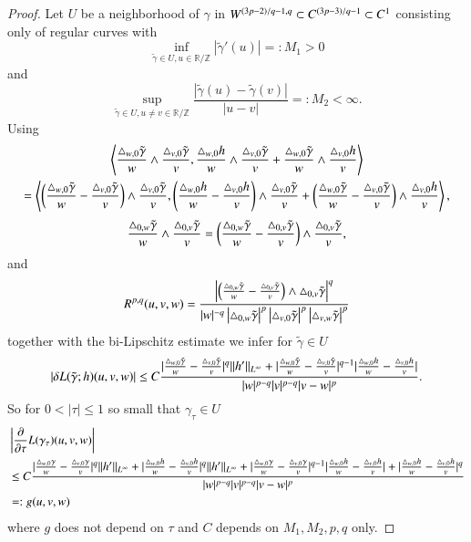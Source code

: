 \begin{proof}
Let $U$ be a neighborhood of $\gamma$ in $\W \subset C^{(3p-3)/q-1} \subset C^1$ consisting only of regular curves with
\begin{equation*}
 \inf_{\tilde \gamma \in U, u \in \mathbb R / \mathbb Z} |\tilde \gamma '(u)| =: M_1 >0 
\end{equation*}
and
\begin{equation*}
 \sup_{\tilde \gamma \in U, u\not=v \in \mathbb R / \mathbb Z} \frac {|\tilde \gamma(u) - \tilde \gamma(v)|}{|u-v|} =: M_2 < \infty. 
\end{equation*}
Using 
\begin{multline*}
 \sp{\frac {\T w0} w \wedge \frac{\T v0} v ,\frac {\T[h] w0} w \wedge \frac {\T v0} v 
 + \frac{\T w0} w\wedge \frac {\T[h] v0} v }
 \\= \sp{\left( \frac{\T w0} w - \frac {\T v0}v \right) \wedge \frac{\T v0} v ,
	\left( \frac{\T[h] w0} w - \frac {\T[h] v0}v \right) \wedge \frac{\T v0} v  
	+ \left( \frac{\T w0} w - \frac {\T v0}v \right) \wedge \frac{\T[h] v0} v},
\end{multline*}
\begin{equation*}
 \frac {\T 0w} w \wedge \frac { \T  0v} v = \left( \frac {\T 0w} w- \frac{\T 0v}v \right) \wedge \frac{\T 0v}v,
\end{equation*}
and
\begin{equation*}
 R^{p,q}(u,v,w) = \frac {\left|\left( \frac {\T 0w} w- \frac{\T 0v}v \right) \wedge \T 0v\right|^q}{|w|^{-q} \abs{\T0w}^{p}\abs{\T v0}^{p}\abs{\T vw}^{p}}
\end{equation*}
together with the bi-Lipschitz estimate we infer for $\tilde \gamma \in U$
\begin{equation}  \label{eq:estimateintegrand}
  \left|\delta L(\tilde \gamma; h)(u,v,w) \right|
 \leq C  \frac{|\frac {\T[\tilde \gamma] w0} w - \frac {\T[\tilde \gamma] v0} v|^q \|h'\|_{L^\infty} +
  |\frac {\T[\tilde \gamma] w0} w - \frac {\T[\tilde \gamma] v0} v|^{q-1}|\frac {\T[h] w0} w - \frac {\T[h] v0} v|}{|w|^{p-q} |v|^{p-q} |v-w|^p}.
\end{equation}
So for $0<|\tau|\leq 1$ so small that $\gamma_\tau \in U$
\begin{equation} \label{eq:majorant}
\begin{split}
 &\left|\frac {\partial}{\partial \tau }L(\gamma_\tau)(u,v,w) \right| \\
 &\leq C  \frac{|\frac {\T[\gamma] w0} w - \frac {\T[\gamma] v0} v|^q \|h'\|_{L^\infty} + |\frac {\T[h] w0} w - \frac {\T[h] v0} v|^q \|h'\|_{L^\infty} +
  |\frac {\T[\gamma] w0} w - \frac {\T[\gamma] v0} v|^{q-1}|\frac {\T[h] w0} w - \frac {\T[h] v0} v| + |\frac {\T[h] w0} w - \frac {\T[h] v0} v| ^q }{|w|^{p-q} |v|^{p-q} |v-w|^p}
 \\ &=: g(u,v,w)
 \end{split}
\end{equation}
where $g$ does not depend on $\tau$ and $C$ depends on $M_1, M_2, p, q$ only.


\end{proof}
